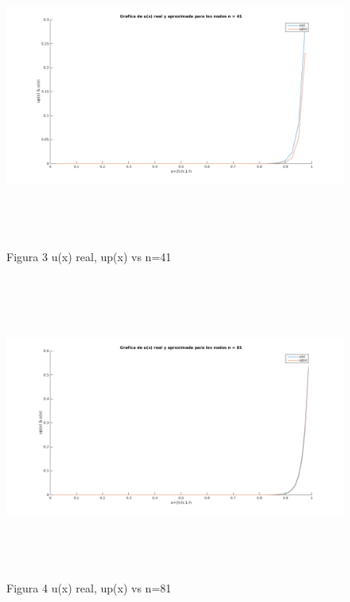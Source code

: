 \documentclass[paper=a4, parskip=full, fontsize=12pt]{scrartcl} %
\numberwithin{equation}{section} %
\numberwithin{figure}{section} %
\numberwithin{table}{section} %
\begin{document}
\begin{figure}[hbtp]
\centering
\includegraphics[width=15cm,height=10cm]{n_41.png}
\caption{Figura 3  u(x) real, up(x) vs n=41}
\end{figure}

\begin{figure}[hbtp]
\centering
\includegraphics[width=15cm,height=10cm]{n_81.png}
\caption{Figura 4  u(x) real, up(x) vs n=81}
\end{figure}
\
\
\\\\
\\
\\
\\
\\
\end{document}
